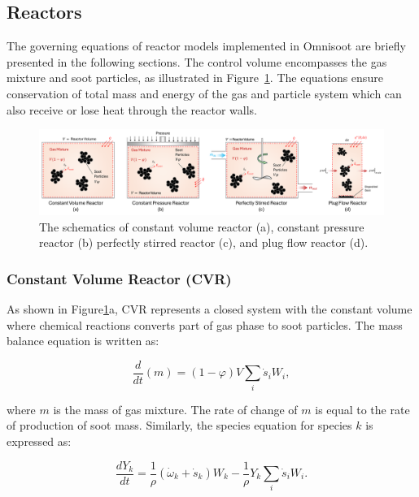 \subsection{Reactors}

The governing equations of reactor models implemented in Omnisoot are briefly presented in the following sections. The control volume encompasses the gas mixture and soot particles, as illustrated in Figure~\ref{fig:reactors}. The equations ensure conservation of total mass and energy of the gas and particle system which can also receive or lose heat through the reactor walls.


\begin{figure}[H]
	\centering
	\includegraphics[width=1\textwidth]{Figures/Theory/reactors.pdf}
	\caption{The schematics of constant volume reactor (a), constant pressure reactor (b) perfectly stirred reactor (c), and plug flow reactor (d).}
	\label{fig:reactors} 
\end{figure}


\subsubsection{Constant Volume Reactor (CVR)}
\label{sec:cvr}
As shown in Figure\ref{fig:reactors}a, CVR represents a closed system with the constant volume where chemical reactions converts part of gas phase to soot particles. The mass balance equation is written as:

\begin{equation}
	\frac{d}{dt}(m) = (1-\varphi)V \sum_i \dot s_i W_i,
	\label{eqn:contconstuv}
\end{equation} 

\noindent where $m$ is the mass of gas mixture. The rate of change of $m$ is equal to the rate of production of soot mass.
Similarly, the species equation for species $k$ is expressed as:

\begin{equation}
	\frac{dY_k}{dt}
	=
	\frac{1}{\rho}
	\left(
		{\dot{\omega}}_k
		+
		{\dot{s}}_k
	\right)W_k
	-\frac{1}{\rho}Y_k\sum_{i}{{\dot{s}}_i W_i}
	\label{eqn:speciesconstuv}.
\end{equation}

